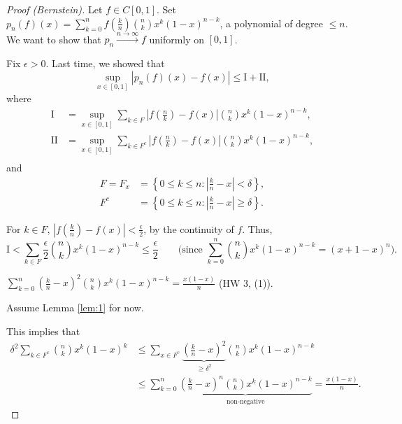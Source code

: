\documentclass[letterpaper, reqno,11pt]{article}
\begin{document}
\begin{proof}[Proof (Bernstein)]
  Let $f \in C[0, 1]$. Set $p_n(f)(x) = \sum_{k = 0}^n f\left(\frac{k}{n}\right) \binom{n}{k} x^k (1 - x)^{n - k}$, a polynomial of degree $\leq n$. We want to show that $p_n \xrightarrow{n \to \infty} f$ uniformly on $[0, 1]$.

  Fix $\epsilon > 0$. Last time, we showed that
  $$ \sup_{x \in [0, 1]} |p_n(f)(x) - f(x)| \leq \text{I} + \text{II}, $$
  where
  \begin{align*}
    \text{I} &= \sup_{x \in [0, 1]} \sum_{k \in F} \left|f\left(\frac{n}{k}\right) - f(x)\right| \binom{n}{k} x^k (1 - x)^{n - k}, \\
    \text{II} &= \sup_{x \in [0, 1]} \sum_{k \in F^c} \left|f\left(\frac{n}{k}\right) - f(x)\right| \binom{n}{k} x^k (1 - x)^{n - k}, \\
  \end{align*}
  and
  \begin{align*}
    F = F_x &= \left\{ 0 \leq k \leq n : \left|\frac{k}{n} - x\right| < \delta \right\}, \\
    F^c &= \left\{ 0 \leq k \leq n : \left|\frac{k}{n} - x\right| \geq \delta \right\}.
  \end{align*}

   For $k \in F$, $\left|f\left(\frac{k}{n}\right) - f(x)\right| < \frac{\epsilon}{2}$, by the continuity of $f$. Thus,
  $$ \text{I} < \sum_{k \in F} \frac{\epsilon}{2} \binom{n}{k} x^k (1 - x)^{n - k} \leq \frac{\epsilon}{2} \qquad \text{(since $\sum_{k = 0}^n \binom{n}{k} x^k (1 - x)^{n - k} = (x + 1 - x)^n$)}. $$

  \begin{lemma} \label{lem:1}
    \normalfont $\sum_{k = 0}^n \left(\frac{k}{n} - x\right)^2 \binom{n}{k} x^k (1 - x)^{n - k} = \frac{x (1 - x)}{n}$ (HW 3, (1)).
  \end{lemma}

  Assume Lemma \ref{lem:1} for now.

  This implies that
  \begin{align*}
    \delta^2 \sum_{k \in F^c} \binom{n}{k} x^k (1 - x)^k &\leq \sum_{x \in F^c} \underbrace{\left(\frac{k}{n} - x\right)^2}_{\geq \delta^2} \binom{n}{k} x^k (1 - x)^{n - k} \\
    &\leq \sum_{k = 0}^n \underbrace{\left(\frac{k}{n} - x\right)^n \binom{n}{k} x^k (1 - x)^{n - k}}_\text{non-negative} = \frac{x(1 - x)}{n}.
  \end{align*}


\end{proof}
\end{document}
